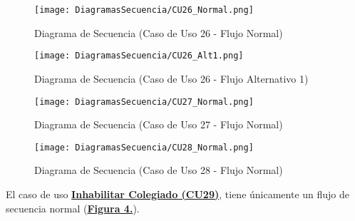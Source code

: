 \begin{landscape}
  \begin{figure}[!htbp]
    \centering
    \texttt{[image: DiagramasSecuencia/CU26\_Normal.png]}
    \caption{Diagrama de Secuencia (Caso de Uso 26 - Flujo Normal)}
    \label{fig:Secuencia_CU26_Normal}
  \end{figure}
\end{landscape}
\FloatBarrier

\begin{landscape}
  \begin{figure}[!htbp]
    \centering
    \texttt{[image: DiagramasSecuencia/CU26\_Alt1.png]}
    \caption{Diagrama de Secuencia (Caso de Uso 26 - Flujo Alternativo 1)}
    \label{fig:Secuencia_CU26_Alt1}
  \end{figure}
\end{landscape}
\FloatBarrier

\begin{landscape}
  \begin{figure}[!htbp]
    \centering
    \texttt{[image: DiagramasSecuencia/CU27\_Normal.png]}
    \caption{Diagrama de Secuencia (Caso de Uso 27 - Flujo Normal)}
    \label{fig:Secuencia_CU27_Normal}
  \end{figure}
\end{landscape}
\FloatBarrier

\begin{landscape}
  \begin{figure}[!htbp]
    \centering
    \texttt{[image: DiagramasSecuencia/CU28\_Normal.png]}
    \caption{Diagrama de Secuencia (Caso de Uso 28 - Flujo Normal)}
    \label{fig:Secuencia_CU28_Normal}
  \end{figure}
\end{landscape}
\FloatBarrier

\addtocounter{figura_cap4}{1}
El caso de uso \textbf{\hyperref[tab:curInhabilitar]{Inhabilitar Colegiado (CU29)}}, tiene únicamente un flujo de secuencia normal (\textbf{\hyperref[fig:Secuencia_CU29_Normal]{Figura 4.}}). \\


